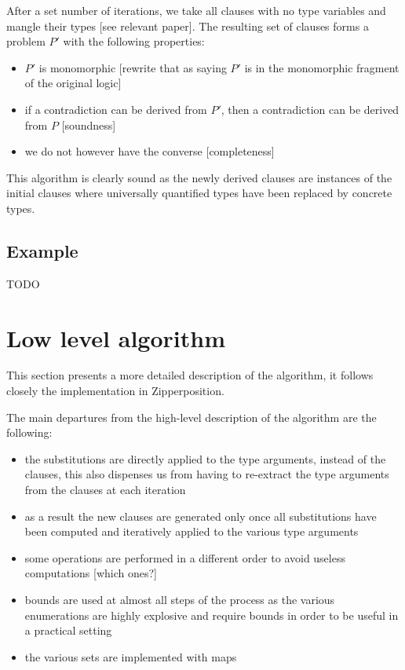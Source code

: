 \documentclass[]{ceurart}
\begin{document}
After a set number of iterations, we take all clauses with no type variables and mangle their types [see relevant paper]. The resulting set of clauses forms a problem \(P'\) with the following properties:
\begin{itemize}
   \item \(P'\) is monomorphic [rewrite that as saying \(P'\) is in the monomorphic fragment of the original logic]
   \item if a contradiction can be derived from \(P'\), then a contradiction can be derived from \(P\) [soundness]
   \item we do not however have the converse [completeness]
\end{itemize}


This algorithm is clearly sound as the newly derived clauses are instances of the initial clauses where universally quantified types have been replaced by concrete types.

\subsection{Example}

TODO

\section{Low level algorithm}
\label{sec:low-level-algorithm}

This section presents a more detailed description of the algorithm, it follows closely the implementation in Zipperposition.

The main departures from the high-level description of the algorithm are the following:
\begin{itemize}
   \item the substitutions are directly applied to the type arguments, instead of the clauses, this also dispenses us from having to re-extract the type arguments from the clauses at each iteration
   \item as a result the new clauses are generated only once all substitutions have been computed and iteratively applied to the various type arguments
   \item some operations are performed in a different order to avoid useless computations [which ones?]
   \item bounds are used at almost all steps of the process as the various enumerations are highly explosive and require bounds in order to be useful in a practical setting
   \item the various sets are implemented with maps
\end{itemize}
\end{document}
